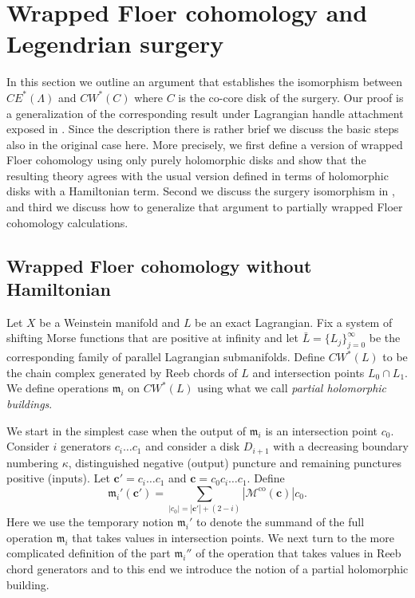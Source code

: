 \documentclass{gtpart}
\newcommand{\m}{\mathfrak{m}}
\renewcommand{\co}{\mathrm{co}}
\begin{document}
\section{Wrapped Floer cohomology and Legendrian surgery}
In this section we outline an argument that establishes the isomorphism between
$CE^{\ast}(\Lambda)$ and $CW^*(C)$ where $C$ is the co-core disk of the surgery. Our proof is a
generalization of the corresponding result under Lagrangian handle attachment exposed in \cite{BEE}.
Since the description there is rather brief we discuss the basic steps also in the original case here. More precisely, we first
define a version of wrapped Floer cohomology using only purely holomorphic disks and show that the
resulting theory agrees with the usual version defined in terms of holomorphic disks with a
Hamiltonian term. Second we discuss the surgery isomorphism in \cite{BEE}, and third we discuss how
to generalize that argument to partially wrapped Floer cohomology calculations.

\subsection{Wrapped Floer cohomology  without Hamiltonian}\label{sec:CWnoHam}
Let $X$ be a Weinstein manifold and $L$ be an exact Lagrangian. Fix a system of shifting Morse functions that are positive at infinity and let $\bar L=\{L_{j}\}_{j=0}^{\infty}$ be the corresponding family of parallel
Lagrangian submanifolds. Define $CW^*(L)$ to be the chain complex generated by Reeb chords of $L$
and intersection points $L_{0}\cap L_{1}$. We define operations $\m_{i}$ on $CW^*(L)$ using what we call \emph{partial holomorphic buildings}.

We start in the simplest case when the output of $\m_{i}$ is an intersection point $c_{0}$. Consider
$i$ generators $c_{i}\dots c_{1}$ and consider a disk $D_{i+1}$ with a decreasing boundary numbering
$\kappa$, distinguished negative (output) puncture and remaining punctures positive (inputs). Let $\mathbf{c}'=c_{i}\dots c_{1}$ and $\mathbf{c}=c_{0}c_{i}\dots c_{1}$. Define
\[ 
\m_{i}'(\mathbf{c}') = \sum_{|c_{0}|=|\mathbf{c}'|+(2-i)}|\mathcal{M}^{\co}(\mathbf{c})|c_{0}.
\]
Here we use the temporary notion $\m_{i}'$ to denote the summand of the full operation $\m_{i}$ that takes values in intersection points. We next turn to the more complicated definition of the part $\m_{i}''$ of the operation that takes values in Reeb chord generators and to this end we introduce the notion of a partial holomorphic building.
\end{document}
